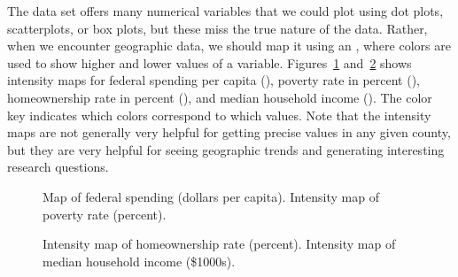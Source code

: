 
The  data set offers many numerical variables that we could plot using dot plots, scatterplots, or box plots, but these miss the true nature of the data. Rather, when we encounter geographic data, we should map it using an , where colors are used to show higher and lower values of a variable. Figures~\ref{countyIntensityMaps1} and~\ref{countyIntensityMaps2} shows intensity maps for federal spending per capita (), poverty rate in percent (), homeownership rate in percent (), and median household income (). The color key indicates which colors correspond to which values. Note that the intensity maps are not generally very helpful for getting precise values in any given county, but they are very helpful for seeing geographic trends and generating interesting research questions.

\begin{figure}
\centering
{}
\caption{ Map of federal spending (dollars per capita).  Intensity map of poverty rate (percent).}
\label{countyIntensityMaps1}
\end{figure}

\begin{figure}
\centering
{}
\caption{ Intensity map of homeownership rate (percent).  Intensity map of median household income (\$1000s).}
\label{countyIntensityMaps2}
\end{figure}

\textC{\pagebreak}

